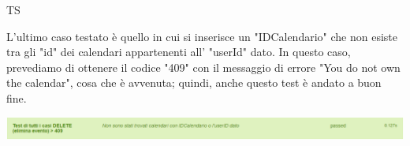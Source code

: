 \begin{listaPersonale}{TS}
\begin{center}
                \end{center}
                L'ultimo caso testato è quello in cui si inserisce un "IDCalendario" che non esiste tra gli "id" dei calendari appartenenti all' "userId" dato. In questo caso, prevediamo di ottenere il codice "409" con il messaggio di errore "You do not own the calendar", cosa che è avvenuta; quindi, anche questo test è andato a buon fine.
                \begin{center}
                        \includegraphics[width=1\textwidth, height=0.04\textheight]{img/png/tests/EventoDelete/409_DeleteEvento.png}
                \end{center}


\end{listaPersonale}
